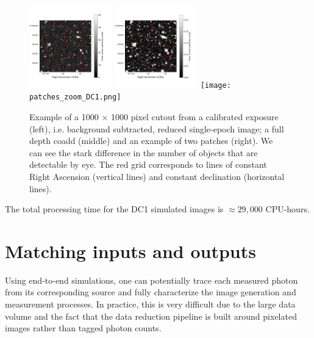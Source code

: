 \documentclass[a4paper,fleqn,usenatbib]{mnras}
\begin{document}
\begin{figure}
\centering
\includegraphics[width=0.32\textwidth]{calexp_example.png}
\includegraphics[width=0.32\textwidth]{coadd_example.png}
\texttt{[image: patches\_zoom\_DC1.png]}
\caption{Example of a 1000 $\times$ 1000 pixel cutout from a calibrated exposure (left), i.e. background subtracted, reduced single-epoch image; a full depth coadd (middle) and an example of two patches (right). We can see the stark difference in the number of objects that are detectable by eye. The red grid corresponds to lines of constant Right Ascension (vertical lines) and constant declination (horizontal lines).}
\label{fig:coadd_example}
\end{figure}

The total processing time for the DC1 simulated images is $\approx 29,000$ CPU-hours.

\section{Matching inputs and outputs}
\label{sec:matching}

Using end-to-end simulations, one can potentially trace each measured photon from its corresponding source and fully characterize the image generation and measurement processes. In practice, this is very difficult due to the large data volume and the fact that the data reduction pipeline is built around pixelated images rather than tagged photon counts.
\end{document}

